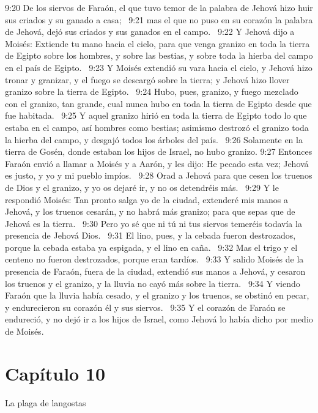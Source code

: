 9:20 De los siervos de Faraón, el que tuvo temor de la palabra de Jehová hizo huir sus criados y su ganado a casa;  
9:21 mas el que no puso en su corazón la palabra de Jehová, dejó sus criados y sus ganados en el campo.  
9:22 Y Jehová dijo a Moisés: Extiende tu mano hacia el cielo, para que venga granizo en toda la tierra de Egipto sobre los hombres, y sobre las bestias, y sobre toda la hierba del campo en el país de Egipto.  
9:23 Y Moisés extendió su vara hacia el cielo, y Jehová hizo tronar y granizar, y el fuego se descargó sobre la tierra; y Jehová hizo llover granizo sobre la tierra de Egipto.  
9:24 Hubo, pues, granizo, y fuego mezclado con el granizo, tan grande, cual nunca hubo en toda la tierra de Egipto desde que fue habitada.  
9:25 Y aquel granizo hirió en toda la tierra de Egipto todo lo que estaba en el campo, así hombres como bestias; asimismo destrozó el granizo toda la hierba del campo, y desgajó todos los árboles del país.  
9:26 Solamente en la tierra de Gosén, donde estaban los hijos de Israel, no hubo granizo. 
9:27 Entonces Faraón envió a llamar a Moisés y a Aarón, y les dijo: He pecado esta vez; Jehová es justo, y yo y mi pueblo impíos.  
9:28 Orad a Jehová para que cesen los truenos de Dios y el granizo, y yo os dejaré ir, y no os detendréis más.  
9:29 Y le respondió Moisés: Tan pronto salga yo de la ciudad, extenderé mis manos a Jehová, y los truenos cesarán, y no habrá más granizo; para que sepas que de Jehová es la tierra.  
9:30 Pero yo sé que ni tú ni tus siervos temeréis todavía la presencia de Jehová Dios.  
9:31 El lino, pues, y la cebada fueron destrozados, porque la cebada estaba ya espigada, y el lino en caña.  
9:32 Mas el trigo y el centeno no fueron destrozados, porque eran tardíos.  
9:33 Y salido Moisés de la presencia de Faraón, fuera de la ciudad, extendió sus manos a Jehová, y cesaron los truenos y el granizo, y la lluvia no cayó más sobre la tierra.  
9:34 Y viendo Faraón que la lluvia había cesado, y el granizo y los truenos, se obstinó en pecar, y endurecieron su corazón él y sus siervos.  
9:35 Y el corazón de Faraón se endureció, y no dejó ir a los hijos de Israel, como Jehová lo había dicho por medio de Moisés.  
\section*{Capítulo 10 }
La plaga de langostas 

